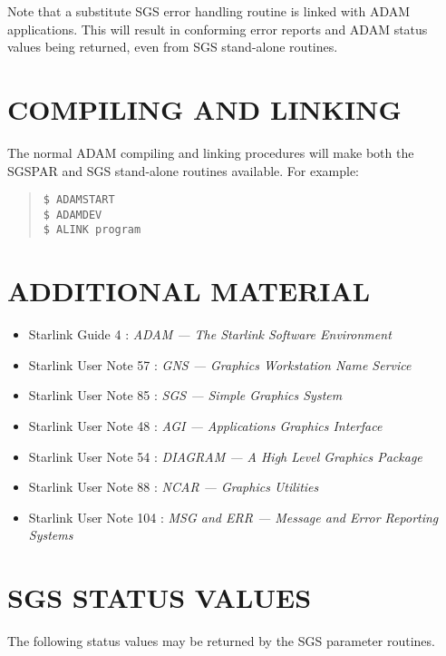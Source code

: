 Note that a substitute SGS error handling routine is linked with ADAM
applications.
This will result in conforming error reports and ADAM status values being 
returned, even from SGS stand-alone routines.

\section{COMPILING AND LINKING}
The normal ADAM compiling and linking procedures will make both the SGSPAR
and SGS stand-alone routines available.
For example:
\begin{quote}
\begin{verbatim}
$ ADAMSTART
$ ADAMDEV
$ ALINK program
\end{verbatim}
\end{quote}

\section{ADDITIONAL MATERIAL}
\begin{itemize}
\item Starlink Guide 4 : {\it ADAM --- The Starlink Software Environment}
\item Starlink User Note 57 : {\it GNS --- Graphics Workstation Name Service}
\item Starlink User Note 85 : {\it SGS --- Simple Graphics System}
\item Starlink User Note 48 : {\it AGI --- Applications Graphics Interface}
\item Starlink User Note 54 : {\it DIAGRAM --- A High Level Graphics Package}
\item Starlink User Note 88 : {\it NCAR --- Graphics Utilities}
\item Starlink User Note 104 : {\it MSG and ERR --- Message and Error Reporting
Systems}
\end{itemize}

\section{SGS STATUS VALUES}
\label{errs}
The following status values may be returned by the SGS parameter
routines.

